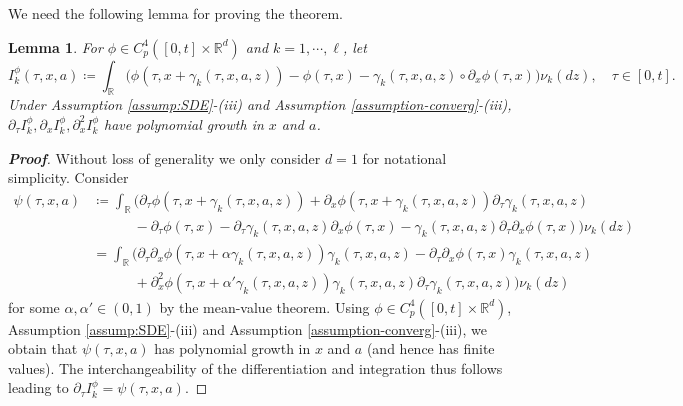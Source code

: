 \documentclass[11pt]{article}
\newtheorem{lemma}{Lemma}
\newcommand{\1}{\mathbbm{1}}
\begin{document}
We need the following lemma for proving the theorem.
\begin{lemma}\label{lem:value-converge-lemma}
	For $\phi \in C^{4}_p([0,t]\times\mathbb{R}^d)$ and $k=1,\cdots,\ell$, let
	\begin{equation}
	I^\phi_k(\tau,x,a)\coloneqq \int_\mathbb{R}\big(\phi(\tau,x+\gamma_k(\tau,x,a,z))-\phi(\tau,x)-\gamma_k(\tau,x,a,z)\circ\partial_x\phi(\tau,x)\big)\nu_k(dz),\quad \tau\in[0,t].	\label{eq:I-phi}
	\end{equation}
Under Assumption \ref{assump:SDE}-(iii) and Assumption \ref{assumption-converg}-(iii), $\partial_\tau I^\phi_k, \partial_xI^\phi_k, \partial_{x}^2I^\phi_k$ have polynomial growth in $x$ and $a$.
\end{lemma}
\begin{proof}[\bf Proof]
Without loss of generality we only consider $d=1$ for notational simplicity. Consider
\begin{align}
	\psi(\tau,x,a)&\coloneqq\int_{\mathbb{R}}\big(\partial_{\tau}\phi(\tau,x+\gamma_k(\tau,x,a,z)) + \partial_x\phi(\tau,x+\gamma_k(\tau,x,a,z))\partial_\tau\gamma_k(\tau,x,a,z)\\
	&\phantom{\int_{\mathbb{R}}\quad~~} - \partial_\tau\phi(\tau,x) - \partial_\tau\gamma_k(\tau,x,a,z)\partial_x\phi(\tau,x) - \gamma_k(\tau,x,a,z)\partial_{\tau}\partial_x\phi(\tau,x)\big)\nu_k(dz)\\
	&=\int_{\mathbb{R}}\big(\partial_{\tau}\partial_x\phi(\tau,x+\alpha\gamma_k(\tau,x,a,z))\gamma_k(\tau,x,a,z)- \partial_{\tau}\partial_x\phi(\tau,x)\gamma_k(\tau,x,a,z) \\
	&\phantom{\int_{\mathbb{R}}\quad~~} + \partial_x^2\phi(\tau,x+\alpha'\gamma_k(\tau,x,a,z))\gamma_k(\tau,x,a,z)\partial_\tau\gamma_k(\tau,x,a,z) \big)\nu_k(dz)
\end{align}
for some $\alpha,\alpha'\in(0,1)$ by the mean-value theorem. Using $\phi \in C^{4}_p([0,t]\times\mathbb{R}^d)$, Assumption \ref{assump:SDE}-(iii) and Assumption \ref{assumption-converg}-(iii), we obtain that $\psi(\tau,x,a)$ has polynomial growth in $x$ and $a$ (and hence has finite values). The interchangeability  of the differentiation and integration thus follows leading to $\partial_\tau I^\phi_k = \psi(\tau,x,a)$.


\end{proof}
\end{document}
